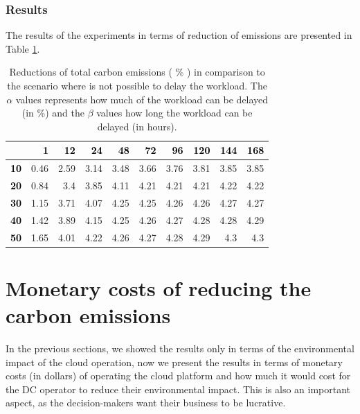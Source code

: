 \subsubsection{Results}

The results of the experiments in terms of reduction of  emissions are presented in Table \ref{tab:flex_scheduling}.



\begin{table}[h]
\caption{Reductions of total carbon emissions ( \% ) in comparison to the scenario where is not possible to delay the workload. The $\alpha$ values represents how much of the workload can be delayed (in \%) and the $\beta$ values how long the workload can be delayed (in hours). }\centering
\label{tab:flex_scheduling}
\begin{tabular}{|l|r|r|r|r|r|r|r|r|r|}
\hline
\backslashbox{$\alpha$}{$\beta$} &   \textcolor{black}{\textbf{ 1}} &  \textcolor{black}{\textbf{ 12 }} &  \textcolor{black}{\textbf{ 24 }} &  \textcolor{black}{\textbf{ 48 }}  &   \textcolor{black}{\textbf{ 72 }} &   \textcolor{black}{\textbf{ 96 }} &   \textcolor{black}{\textbf{ 120  }} &   \textcolor{black}{\textbf{ 144 }} &   \textcolor{black}{\textbf{ 168 }} \\ 
     \hline
 \textcolor{black}{ \textbf{10}}   &  0.46 &  2.59 &  3.14 &  3.48 &  3.66 &  3.76 &  3.81 &  3.85 &  3.85 \\ 
\hline
 \textcolor{black}{ \textbf{20}}   &  0.84 &  3.4 &  3.85 &  4.11 &  4.21 &  4.21 &  4.21 &  4.22 &  4.22 \\ 
\hline
 \textcolor{black}{ \textbf{30}}   &  1.15 &  3.71 &  4.07 &  4.25 &  4.25 &  4.26 &  4.26 &  4.27 &  4.27 \\ 
\hline
 \textcolor{black}{ \textbf{40}}   &  1.42 &  3.89 &  4.15 &  4.25 &  4.26 &  4.27 &  4.28 &  4.28 &  4.29 \\ 
\hline
 \textcolor{black}{ \textbf{50}}   &  1.65 &  4.01 &  4.22 &  4.26 &  4.27 &  4.28 &  4.29 &  4.3 &  4.3 \\ 
\hline
\end{tabular}
\end{table}


\section{ Monetary costs of reducing the carbon emissions}
\label{sec:costs}
In the previous sections, we showed the results only in terms of the environmental impact of the cloud operation, now we present the results in terms of monetary costs (in dollars) of operating the cloud platform and how much it would cost for the DC operator to reduce their environmental impact. This is also an important aspect, as the decision-makers want their business to be lucrative.

